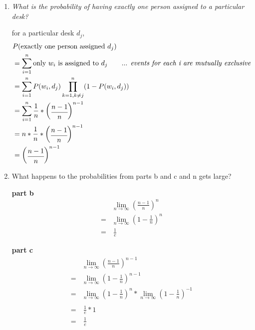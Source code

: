\documentclass{homeworg}
\begin{document}
\begin{enumerate}[label=\alph*)]
    \item \emph{What is the probability of having exactly one person assigned to a particular desk?}
    
    for a particular desk $d_j$,
    \begin{align*}
        & P(\text{exactly one person assigned}\ d_j) \\
        & = \sum_{i = 1}^{n} \text{only } w_i \text{ is assigned to}\ d_j \qquad  \text{... \textit{events for each i are mutually exclusive}} \\
        & = \sum_{i = 1}^{n} P(w_i, d_j) \prod_{k=1, k \ne j}^n (1- P(w_i, d_j))\\
        & = \sum_{i = 1}^{n} \frac{1}{n} \ast 
            \begin{pmatrix}
                \cfrac{n-1}{n}
            \end{pmatrix}^{n-1}\\
        & = n 
            \ast  \frac{1}{n} 
            \ast 
            \begin{pmatrix}
                \cfrac{n-1}{n}
            \end{pmatrix}^{n-1}\\
        & = \begin{pmatrix}
                \cfrac{n-1}{n}
            \end{pmatrix}^{n-1}
    \end{align*}
    
    \item What happens to the probabilities from parts b and c and n gets large?
    
    \textbf{part b}
    \begin{align*}
        & \lim_{n \to \infty} \left( \frac{n-1}{n} \right)^n \\
        =& \lim_{n \to \infty} \left( 1 -  \frac{1}{n} \right)^n \\
        =& \ \frac{1}{e} \label{eq}
    \end{align*}
    
    \textbf{part c}
    \begin{align*}
        & \lim_{n \to \infty} \left( \frac{n-1}{n} \right)^{n-1} \\
        =& \lim_{n \to \infty} \left( 1 -  \frac{1}{n} \right)^{n-1} \\
        =& \lim_{n \to \infty} \left( 1 -  \frac{1}{n} \right)^{n} 
        \ast \lim_{n \to \infty} \left( 1 -  \frac{1}{n} \right)^{-1} \\\\
        =& \ \frac{1}{e} \ast 1 \\
        =&\ \frac{1}{e}
    \end{align*}
\end{enumerate}
\newpage
\end{document}
